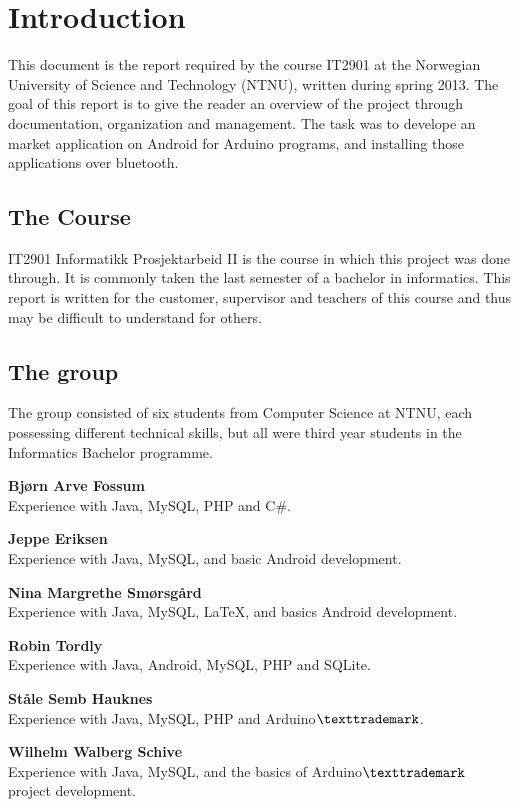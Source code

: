 \chapter{Introduction}

This document is the report required by the course IT2901 at the Norwegian University of Science and Technology (NTNU), written during spring 2013. The goal of this report is to give the reader an overview of the project through documentation, organization and management.
The task was to develope an market application on Android for Arduino programs, and installing those applications over bluetooth.

\section{The Course}
IT2901 Informatikk Prosjektarbeid II is the course in which this project was done through. It is commonly taken the last semester of a bachelor in informatics. This report is written for the customer, supervisor and teachers of this course and thus may be difficult to understand for others.

\section{The group}
The group consisted of six students from Computer Science at NTNU, each possessing different technical skills, but all were third year students in the Informatics Bachelor programme.

\begin{description}
	\item{\textbf{Bjørn Arve Fossum}}\hfill \\
		Experience with Java, MySQL, PHP and C\#.
	\item{\textbf{Jeppe Eriksen}}\hfill \\
		Experience with Java, MySQL, and basic Android development.
	\item{\textbf{Nina Margrethe Smørsgård}}\hfill \\
		Experience with Java, MySQL, \LaTeX, and basics Android development.
	\item{\textbf{Robin Tordly}}\hfill \\
		Experience with Java, Android, MySQL, PHP and SQLite.
	\item{\textbf{Ståle Semb Hauknes}}\hfill \\
		Experience with Java, MySQL, PHP and Arduino$\texttrademark$.
	\item{\textbf{Wilhelm Walberg Schive}}\hfill \\
		Experience with Java, MySQL, and the basics of Arduino$\texttrademark$ project development.

\end{description}

